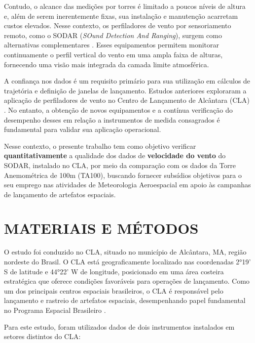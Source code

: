 \documentclass[12pt, a4paper, twocolumn]{article}
\begin{document}
Contudo, o alcance das medições por torres é limitado a poucos níveis de altura e, além de serem inerentemente fixas, sua instalação e manutenção acarretam custos elevados. Nesse contexto, os perfiladores de vento por sensoriamento remoto, como o SODAR (\textit{SOund Detection And Ranging}), surgem como alternativas complementares \cite{weber1990preliminary}. Esses equipamentos permitem monitorar continuamente o perfil vertical do vento em uma ampla faixa de alturas, fornecendo uma visão mais integrada da camada limite atmosférica.

A confiança nos dados é um requisito primário para sua utilização em cálculos de trajetória e definição de janelas de lançamento. Estudos anteriores exploraram a aplicação de perfiladores de vento no Centro de Lançamento de Alcântara (CLA) \cite{custodio2016,custodio2024,correa2023observational}. No entanto, a obtenção de novos equipamentos e a contínua verificação do desempenho desses em relação a instrumentos de medida consagrados é fundamental para validar sua aplicação operacional. 

Nesse contexto, o presente trabalho tem como objetivo verificar \textbf{quantitativamente} a qualidade dos dados de \textbf{velocidade do vento} do SODAR, instalado no CLA, por meio da comparação com os dados da Torre Anemométrica de 100m (TA100), buscando fornecer subsídios objetivos para o seu emprego nas atividades de Meteorologia Aeroespacial em apoio às campanhas de lançamento de artefatos espaciais.

\section{MATERIAIS E MÉTODOS}

O estudo foi conduzido no CLA, situado no município de Alcântara, MA, região nordeste do Brasil. O CLA está geograficamente localizado nas coordenadas 2°19' S de latitude e 44°22' W de longitude, posicionado em uma área costeira estratégica que oferece condições favoráveis para operações de lançamento. Como um dos principais centros espaciais brasileiros, o CLA é responsável pelo lançamento e rastreio de artefatos espaciais, desempenhando papel fundamental no Programa Espacial Brasileiro \cite{bellintani2024desenvolvimento}.

Para este estudo, foram utilizados dados de dois instrumentos instalados em setores distintos do CLA:
\end{document}
